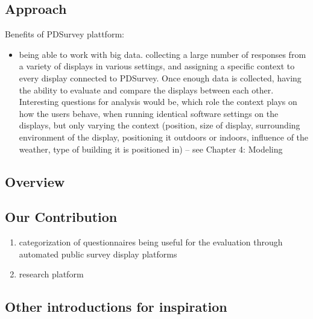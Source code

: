 	\subsection{Approach}



	Benefits of PDSurvey plattform:

	\begin{itemize}
	\item being able to work with big data. collecting a large number of responses from a variety of displays in various settings, and assigning a specific context to every display connected to PDSurvey. Once enough data is collected, having the ability to evaluate and compare the displays between each other. Interesting questions for analysis would be, which role the context plays on how the users behave, when running identical software settings on the displays, but only varying the context (position, size of display, surrounding environment of the display, positioning it outdoors or indoors, influence of the weather, type of building it is positioned in) -- see Chapter 4: Modeling
	\end{itemize}


	\subsection{Overview}



	\subsection{Our Contribution}

	\begin{enumerate}
	\item categorization of questionnaires being useful for the evaluation through automated public survey display platforms
	\item research platform

	\end{enumerate}








	\subsection{Other introductions for inspiration}

